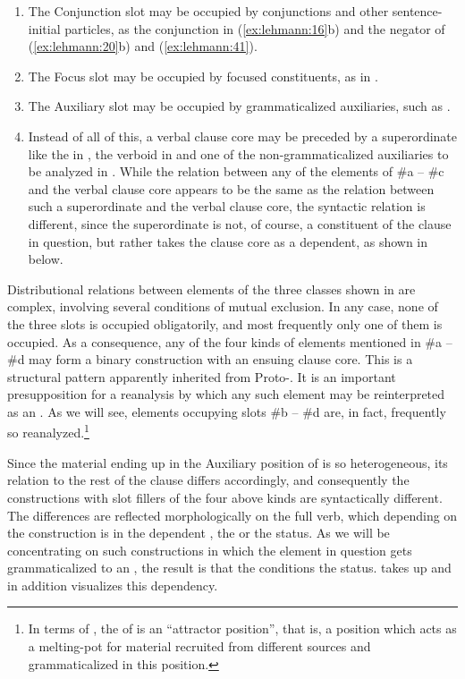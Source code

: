 \documentclass[output=paper]{langsci/langscibook}
\begin{document}
\begin{enumerate}[label=\alph*.]
\item The Conjunction slot may be occupied by conjunctions and other sentence-initial particles, as the conjunction in (\ref{ex:lehmann:16}b) and the negator of (\ref{ex:lehmann:20}b) and (\ref{ex:lehmann:41}).
\item The Focus slot may be occupied by focused constituents, as in .
\item The Auxiliary slot may be occupied by grammaticalized auxiliaries, such as .
\item Instead of all of this, a verbal clause core may be preceded by a superordinate  like the  in , the  verboid in  and one of the non-grammaticalized auxiliaries to be analyzed in . While the  relation between any of the elements of \#a – \#c and the verbal clause core appears to be the same as the  relation between such a superordinate  and the verbal clause core, the syntactic relation is different, since the superordinate  is not, of course, a constituent of the clause in question, but rather takes the clause core as a dependent, as shown in   below.
\end{enumerate}

Distributional relations between elements of the three classes shown in  are complex, involving several conditions of mutual exclusion. In any case, none of the three slots is occupied obligatorily, and most frequently only one of them is occupied. As a consequence,  any of the four kinds of elements mentioned in \#a – \#d may form a binary construction with an ensuing clause core. This is a structural pattern apparently inherited from Proto-. It is an important presupposition for a reanalysis by which any such element may be reinterpreted as an . As we will see, elements occupying slots \#b – \#d are, in fact, frequently so reanalyzed.\footnote{In terms of \citet[esp. 511--513 and 535f]{Bisang1991}, the  of  is an “attractor position”, that is, a position which acts as a melting-pot for material recruited from different sources and grammaticalized in this position.}

Since the material ending up in the Auxiliary position of  is so heterogeneous, its relation to the rest of the clause differs accordingly, and consequently the constructions with slot fillers of the four above kinds are syntactically different. The differences are reflected morphologically on the full verb, which depending on the construction is in the dependent , the  or the  status. As we will be concentrating on such constructions in which the element in question gets grammaticalized to an , the result is that the  conditions the status.  takes up  and in addition visualizes this dependency.
\end{document}
